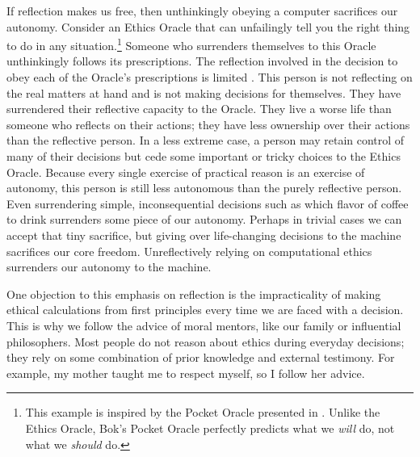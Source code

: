 \begin{isabellebody}
\begin{isamarkuptext}
If reflection makes us free, then unthinkingly obeying a computer sacrifices our autonomy. Consider 
an Ethics Oracle that can unfailingly tell you the right thing to do in any 
situation.\footnote{This example is inspired by the Pocket Oracle presented in \citet{bok}. Unlike the
Ethics Oracle, Bok's Pocket Oracle perfectly predicts what we \emph{will} do, not what we \emph{should} do.} Someone 
who surrenders themselves to this Oracle unthinkingly follows its prescriptions. 
The reflection involved in the decision to obey each of the Oracle’s prescriptions is limited \citep{bok}. 
This person is not reflecting on the real matters at hand and is 
not making decisions for themselves. They have surrendered their reflective capacity to the Oracle. 
They live a worse life than someone who reflects on their actions; they have less ownership over their 
actions than the reflective person. In a less extreme case, a person may retain control of many of 
their decisions but cede some important or tricky choices to the Ethics Oracle. Because every single 
exercise of practical reason is an exercise of autonomy, this person is still less autonomous than the 
purely reflective person. Even surrendering simple, inconsequential decisions such as which flavor of 
coffee to drink surrenders some piece of our autonomy. Perhaps in trivial cases we can accept that 
tiny sacrifice, but giving over life-changing decisions to the machine sacrifices our 
core freedom. Unreflectively relying on computational ethics surrenders our autonomy to the machine. 

One objection to this emphasis on reflection is the impracticality of making ethical calculations from first principles 
every time we are faced with a decision. This is why we follow the advice of moral mentors, like our 
family or influential philosophers. 
Most people do not reason about ethics during everyday decisions; they rely on some combination of 
prior knowledge and external testimony. For example, my mother taught me to respect myself, so I 
follow her advice. 


\end{isamarkuptext}
\end{isabellebody}
